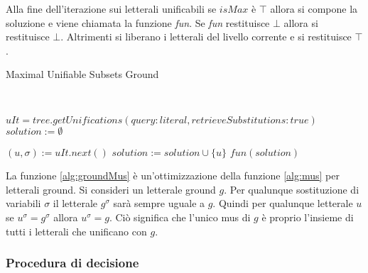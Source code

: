 \documentclass[./main.tex]{subfiles}
\begin{document}
Alla fine dell'iterazione sui letterali unificabili se $isMax$ è $\top$ 
allora si compone la soluzione e viene chiamata la funzione \textit{fun}.
Se \textit{fun} restituisce $\bot$ allora si restituisce $\bot$.
Altrimenti si liberano i letterali del livello corrente e si restituisce $\top$.


\begin{algorithm}[H] \label{alg:groundMus}
    \caption{Maximal Unifiable Subsets Ground}
    \\

$uIt = tree.getUnifications(query: literal, retrieveSubstitutions: true)$\;
$solution := \emptyset$\;

 {
    $(u, \sigma) := uIt.next()$\;
     {
        $solution := solution \cup \{u\}$\;
    }
}
\Return $fun(solution)$\;
\end{algorithm}

La funzione \ref{alg:groundMus} è un'ottimizzazione della funzione \ref{alg:mus} per letterali ground.
Si consideri un letterale ground $g$. Per qualunque sostituzione di variabili $\sigma$ 
il letterale $g^\sigma$ sarà sempre uguale a $g$. Quindi per qualunque letterale $u$ se $u^\sigma = g^\sigma$ allora $u^\sigma = g$.
Ciò significa che l'unico mus di $g$ è proprio l'insieme di tutti i letterali che unificano con $g$.

\subsubsection{Procedura di decisione}
\end{document}
